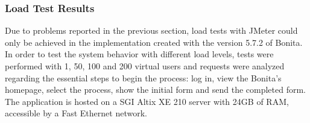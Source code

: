 \documentclass[runningheads,a4paper]{llncs}
\begin{document}
\subsubsection{Load Test Results}

Due to problems reported in the previous section, load tests with JMeter could only be achieved in the implementation created with the version 5.7.2 of Bonita. In order to test the system behavior with different load levels, tests were performed with 1, 50, 100 and 200 virtual users and requests were analyzed regarding the essential steps to begin the process: log in, view the Bonita's homepage, select the process, show the initial form and send the completed form. The application is hosted on a SGI Altix XE 210 server with 24GB of RAM, accessible by a Fast Ethernet network.


\end{document}
